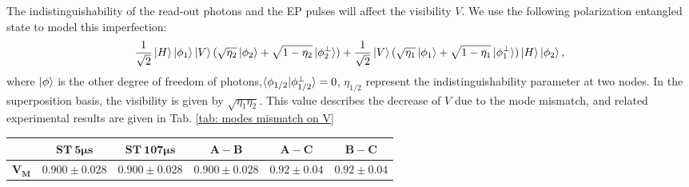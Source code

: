 \documentclass[aps,reprint,showpacs,superscriptaddress]{revtex4-2}
\begin{document}
 The indistinguishability of the read-out photons and the EP pulses will affect the visibility $V$.  We use the following polarization entangled state to model this imperfection:
\begin{equation}
	\frac{1}{\sqrt{2}}\ket{H}\ket{\phi_1}\ket{V}(\sqrt{\eta_2}\ket{\phi_2}+\sqrt{1-\eta_2}\ket{\phi_2^\perp})+\frac{1}{\sqrt{2}}\ket{V}(\sqrt{\eta_1}\ket{\phi_1}+\sqrt{1-\eta_1}\ket{\phi_1^\perp})\ket{H}\ket{\phi_2},
\end{equation}
 where $\ket{\phi}$ is the other degree of freedom of photons,$\braket{\phi_{1/2}|\phi_{1/2}^\perp}=0$, $\eta_{1/2}$ represent the indistinguishability parameter at two nodes. In the superposition basis, the visibility is given by  $\sqrt{\eta_1\eta_2}$. This value describes the decrease of $V$ due to the mode mismatch, and related experimental results are given in Tab. \ref{tab: modes mismatch on V}
\begin{table*}[!htbp]
	\caption{$V_M$ under mode mismatch}
	\label{tab: modes mismatch on V}
	\renewcommand\arraystretch{1.2}
	\begin{ruledtabular}
	\begin{tabular}{cccccc}
		& $\bm{ST\  5\mu s}$ &  $\bm{ST \ 107\mu s}$ & $\bm{A-B}$& $\bm{A-C}$ & $\bm{B-C}$\\
		\hline
		$\bm{V_M}$ &$0.900\pm0.028$&$0.900\pm 0.028$&$0.900\pm0.028$&$0.92\pm0.04$&$0.92\pm0.04$\\
	\end{tabular}
\end{ruledtabular}
\end{table*}
\end{document}
